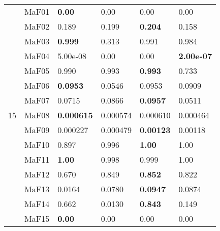 \documentclass[]{article}
\begin{document}
\begin{table}
\begin{footnotesize}
\begin{tabular}{|l|l|l|l|l|l|}
\multirow{15}{*}{15} & MaF01 & \cellcolor{gray95} {\bf 0.00} & \cellcolor{gray95} 0.00 & \cellcolor{gray95} 0.00 & \cellcolor{gray95} 0.00\\
 & MaF02 & 0.189 & \cellcolor{gray95} 0.199 & \cellcolor{gray95} {\bf 0.204} & 0.158\\
 & MaF03 & \cellcolor{gray95} {\bf 0.999} & 0.313 & 0.991 & 0.984\\
 & MaF04 & \cellcolor{gray95} 5.00e-08 & \cellcolor{gray95} 0.00 & \cellcolor{gray95} 0.00 & \cellcolor{gray95} {\bf 2.00e-07}\\
 & MaF05 & 0.990 & \cellcolor{gray95} 0.993 & \cellcolor{gray95} {\bf 0.993} & 0.733\\
 & MaF06 & \cellcolor{gray95} {\bf 0.0953} & 0.0546 & \cellcolor{gray95} 0.0953 & 0.0909\\
 & MaF07 & \cellcolor{gray95} 0.0715 & \cellcolor{gray95} 0.0866 & \cellcolor{gray95} {\bf 0.0957} & 0.0511\\
 & MaF08 & \cellcolor{gray95} {\bf 0.000615} & 0.000574 & \cellcolor{gray95} 0.000610 & 0.000464\\
 & MaF09 & 0.000227 & 0.000479 & \cellcolor{gray95} {\bf 0.00123} & \cellcolor{gray95} 0.00118\\
 & MaF10 & 0.897 & 0.996 & \cellcolor{gray95} {\bf 1.00} & 1.00\\
 & MaF11 & \cellcolor{gray95} {\bf 1.00} & 0.998 & 0.999 & 1.00\\
 & MaF12 & 0.670 & \cellcolor{gray95} 0.849 & \cellcolor{gray95} {\bf 0.852} & \cellcolor{gray95} 0.822\\
 & MaF13 & 0.0164 & 0.0780 & \cellcolor{gray95} {\bf 0.0947} & 0.0874\\
 & MaF14 & \cellcolor{gray95} 0.662 & 0.0130 & \cellcolor{gray95} {\bf 0.843} & 0.149\\
 & MaF15 & \cellcolor{gray95} {\bf 0.00} & \cellcolor{gray95} 0.00 & \cellcolor{gray95} 0.00 & \cellcolor{gray95} 0.00\\
\hline
\end{tabular}
\end{footnotesize}
\end{table}
\end{document}
